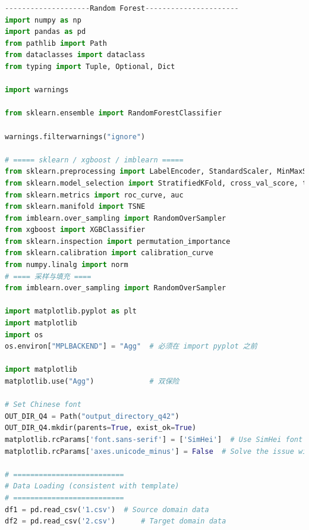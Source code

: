 \documentclass[a4paper]{CPIPC}
\numberwithin{equation}{section}
\begin{document}
\begin{lstlisting}[language=Python, caption=Random Forest Classifier]
--------------------Random Forest----------------------
import numpy as np
import pandas as pd
from pathlib import Path
from dataclasses import dataclass
from typing import Tuple, Optional, Dict

import warnings

from sklearn.ensemble import RandomForestClassifier

warnings.filterwarnings("ignore")

# ===== sklearn / xgboost / imblearn =====
from sklearn.preprocessing import LabelEncoder, StandardScaler, MinMaxScaler, QuantileTransformer
from sklearn.model_selection import StratifiedKFold, cross_val_score, train_test_split
from sklearn.metrics import roc_curve, auc
from sklearn.manifold import TSNE
from imblearn.over_sampling import RandomOverSampler
from xgboost import XGBClassifier
from sklearn.inspection import permutation_importance
from sklearn.calibration import calibration_curve
from numpy.linalg import norm
# ==== 采样与填充 ====
from imblearn.over_sampling import RandomOverSampler

import matplotlib.pyplot as plt
import matplotlib
import os
os.environ["MPLBACKEND"] = "Agg"  # 必须在 import pyplot 之前

import matplotlib
matplotlib.use("Agg")             # 双保险

# Set Chinese font
OUT_DIR_Q4 = Path("output_directory_q42")
OUT_DIR_Q4.mkdir(parents=True, exist_ok=True)
matplotlib.rcParams['font.sans-serif'] = ['SimHei']  # Use SimHei font
matplotlib.rcParams['axes.unicode_minus'] = False  # Solve the issue with negative signs

# ==========================
# Data Loading (consistent with template)
# ==========================
df1 = pd.read_csv('1.csv')  # Source domain data
df2 = pd.read_csv('2.csv')      # Target domain data


\end{lstlisting}
\end{document}
